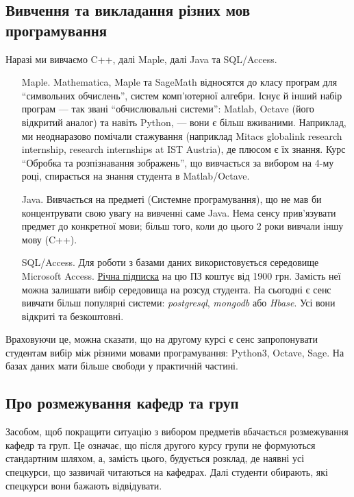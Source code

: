 \documentclass[14pt, a4paper]{extarticle}  %
\begin{document}
\subsection{Вивчення та викладання різних мов програмування}
\label{Languages}

Наразі ми вивчаємо C++, далі Maple, далі Java та SQL/Access. 
\begin{itemize}
    \item [Maple.] Mathematica, Maple та SageMath відносятся до класу програм для ``символьних обчислень'', систем комп'ютерної алгебри. Існує й інший набір програм --- так звані ``обчислювальні системи'': Matlab, Octave (його відкритий аналог) та навіть Python, --- вони є більш вживаними. Наприклад, ми неоднаразово помічали стажування (наприклад Mitacs globalink research internship, research internships at IST Austria), де плюсом є їх знання. Курс ``Обробка та розпізнавання зображень'', що вивчається за вибором на 4-му році, спирається на знання студента в Matlab/Octave. 
    
    \item [Java.] Вивчається на предметі (Системне програмування), що не мав би концентрувати свою увагу на вивченні саме Java. Нема сенсу прив'я\-зувати предмет до конкретної мови; більш того, коли до цього 2 роки вивчали іншу мову (C++).  
    
    \item [SQL/Access.] Для роботи з базами даних використовується середовище Microsoft Access. \href{https://products.office.com/uk-UA/buy/office}{Річна підписка} на цю ПЗ коштує від 1900 грн. Замість неї можна залишати вибір середовища на розсуд студента. На сьогодні є сенс вивчати більш популярні системи: \textit{postgresql}, \textit{mongodb} або \textit{Hbase}. Усі вони відкриті та безкоштовні. 
\end{itemize}



Враховуючи це, можна сказати, що на другому курсі є сенс запропонувати студентам вибір між різними мовами програмування: Python3, Octave, Sage. 
На базах даних мати більше свободи у практичній частині. 

\subsection{Про розмежування кафедр та груп}
\label{cathedra_demarcation}
Засобом, щоб покращити ситуацію з вибором предметів вбачається розмежування кафедр та груп. Це означає, що після другого курсу групи не формуються стандартним шляхом, а, замість цього, будується розклад, де наявні усі спецкурси, що зазвичай читаються на кафедрах. Далі студенти обирають, які спецкурси вони бажають відвідувати.
\end{document}
